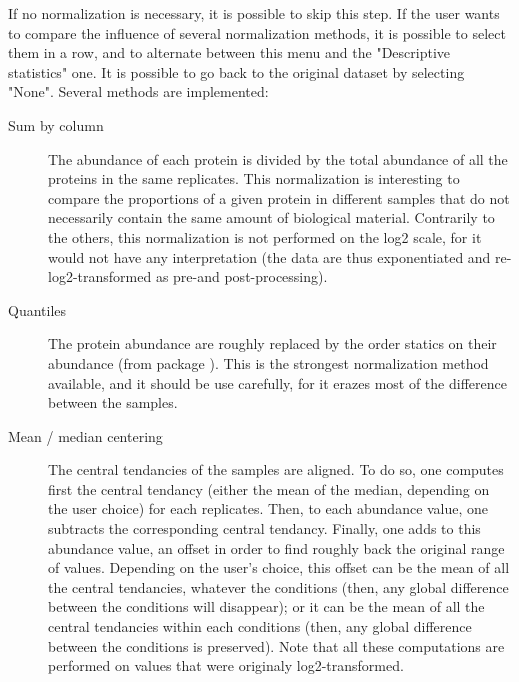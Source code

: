 \documentclass[12pt]{article}
\begin{document}
If no normalization is necessary, it is possible to skip this step.
If the user wants to compare the influence of several normalization methods, it is possible to select them in a row, and to alternate between this menu and the "Descriptive statistics" one. It is possible to go back to the original dataset by selecting "None".
Several methods are implemented:
\begin {description}
    \item[Sum by column] The abundance of each protein is divided by the total abundance of all the proteins in the same replicates. This normalization is interesting to compare the proportions of a given protein in different samples that do not necessarily contain the same amount of biological material. Contrarily to the others, this normalization is not performed on the log2 scale, for it would not have any interpretation (the data are thus exponentiated and re-log2-transformed as pre-and post-processing).
    \item[Quantiles] The protein abundance are roughly replaced by the order statics on their abundance (from package ). This is the strongest normalization method available, and it should be use carefully, for it erazes most of the difference between the samples.
    \item[Mean / median centering] The central tendancies of the samples are aligned. To do so, one computes first the central tendancy (either the mean of the median, depending on the user choice) for each replicates. Then, to each abundance value, one subtracts the corresponding central tendancy. Finally, one adds to this abundance value, an offset in order to find roughly back the original range of values. Depending on the user's choice, this offset can be the mean of all the central tendancies, whatever the conditions (then, any global difference between the conditions will disappear);  or it can be the mean of all the central tendancies within each conditions (then, any global difference between the conditions is preserved).
Note that all these computations are performed on values that were originaly log2-transformed.

\end{description}
\end{document}
